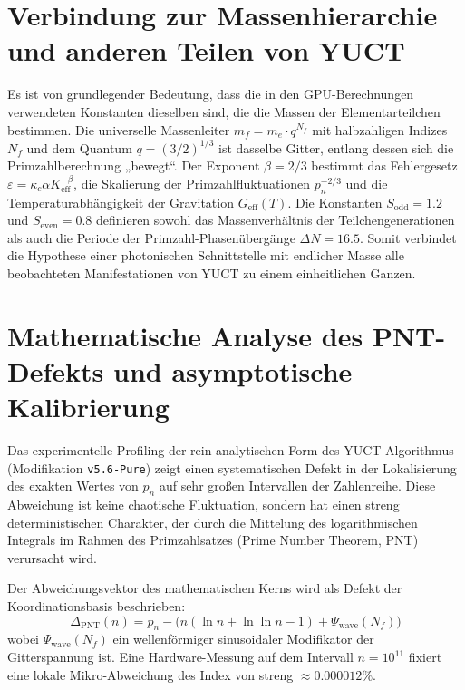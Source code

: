 \documentclass[11pt,a4paper]{article}
\begin{document}
	\section{Verbindung zur Massenhierarchie und anderen Teilen von YUCT}
	Es ist von grundlegender Bedeutung, dass die in den GPU-Berechnungen verwendeten Konstanten dieselben sind, die die Massen der Elementarteilchen bestimmen. Die universelle Massenleiter $m_f = m_e \cdot q^{N_f}$ mit halbzahligen Indizes $N_f$ und dem Quantum $q = (3/2)^{1/3}$ ist dasselbe Gitter, entlang dessen sich die Primzahlberechnung „bewegt“. Der Exponent $\beta = 2/3$ bestimmt das Fehlergesetz $\varepsilon = \kappa_c \alpha K_{\mathrm{eff}}^{-\beta}$, die Skalierung der Primzahlfluktuationen $p_n^{-2/3}$ und die Temperaturabhängigkeit der Gravitation $G_{\mathrm{eff}}(T)$. Die Konstanten $S_{\mathrm{odd}} = 1.2$ und $S_{\mathrm{even}} = 0.8$ definieren sowohl das Massenverhältnis der Teilchengenerationen als auch die Periode der Primzahl-Phasenübergänge $\Delta N = 16.5$. Somit verbindet die Hypothese einer photonischen Schnittstelle mit endlicher Masse alle beobachteten Manifestationen von YUCT zu einem einheitlichen Ganzen.
	
	\section{Mathematische Analyse des PNT-Defekts und asymptotische Kalibrierung}
	Das experimentelle Profiling der rein analytischen Form des YUCT-Algorithmus (Modifikation \texttt{v5.6-Pure}) zeigt einen systematischen Defekt in der Lokalisierung des exakten Wertes von $p_n$ auf sehr großen Intervallen der Zahlenreihe. Diese Abweichung ist keine chaotische Fluktuation, sondern hat einen streng deterministischen Charakter, der durch die Mittelung des logarithmischen Integrals im Rahmen des Primzahlsatzes (Prime Number Theorem, PNT) verursacht wird.
	
	Der Abweichungsvektor des mathematischen Kerns wird als Defekt der Koordinationsbasis beschrieben:
	\begin{equation}
		\Delta_{\mathrm{PNT}}(n) = p_n - \bigl( n(\ln n + \ln\ln n - 1) + \Psi_{\mathrm{wave}}(N_f) \bigr)
	\end{equation}
	wobei $\Psi_{\mathrm{wave}}(N_f)$ ein wellenförmiger sinusoidaler Modifikator der Gitterspannung ist. Eine Hardware-Messung auf dem Intervall $n = 10^{11}$ fixiert eine lokale Mikro-Abweichung des Index von streng $\approx 0.000012\%$.
	
\end{document}
